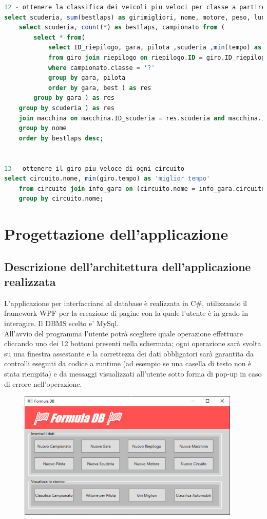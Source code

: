\documentclass[a4paper,12pt]{report}
\begin{document}
\begin{lstlisting}[language=SQL]
12 - ottenere la classifica dei veicoli piu veloci per classe a partire dal numero di giri migliori fatti
select scuderia, sum(bestlaps) as girimigliori, nome, motore, peso, lunghezza, larghezza from (
	select scuderia, count(*) as bestlaps, campionato from (
		select * from(
			select ID_riepilogo, gara, pilota ,scuderia ,min(tempo) as best, campionato
			from giro join riepilogo on riepilogo.ID = giro.ID_riepilogo join info_gara on info_gara.ID = riepilogo.gara join campionato on campionato.ID = info_gara.campionato
			where campionato.classe = '?'
			group by gara, pilota
			order by gara, best ) as res
		group by gara ) as res
	group by scuderia ) as res
	join macchina on macchina.ID_scuderia = res.scuderia and macchina.ID_campionato = res.campionato
	group by nome
	order by bestlaps desc;
	
	
13 - ottenere il giro piu veloce di ogni circuito
select circuito.nome, min(giro.tempo) as 'miglior tempo'
	from circuito join info_gara on (circuito.nome = info_gara.circuito) join riepilogo on (info_gara.id = riepilogo.gara) join giro on (riepilogo.id = giro.ID_riepilogo)
	group by circuito.nome;

			\end{lstlisting}
	\chapter{Progettazione dell'applicazione}
		\section{Descrizione dell'architettura dell'applicazione realizzata}
			L'applicazione per interfacciarsi al database è realizzata in C\#, utilizzando il framework
			WPF per la creazione di pagine con la quale l'utente è in grado in interagire.
			Il DBMS scelto e' MySql.\\
			All'avvio del programma l'utente potrà scegliere quale operazione effettuare cliccando uno dei 12 bottoni 
			presenti nella schermata; ogni operazione sarà svolta su una finestra assestante e la correttezza dei dati obbligatori
			sarà garantita da controlli eseguiti da codice a runtime (ad esempio se una casella di testo non è stata riempita) e 
			da messaggi visualizzati all'utente sotto forma di pop-up in caso di errore nell'operazione.
			\begin{figure}[htbp]
				\centering
				\includegraphics[scale=1]{copies/gui.png}
			\end{figure}
\end{document}
